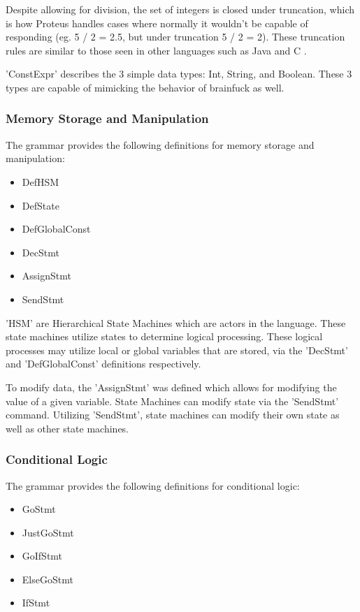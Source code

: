 Despite allowing for division, the set of integers is closed under truncation, which is how Proteus handles cases where normally it wouldn't be capable of responding (eg. 5 / 2 = 2.5, but under truncation 5 / 2 = 2).
These truncation rules are similar to those seen in other languages such as Java and C \cite{TruncJava,TruncC}.

'ConstExpr' describes the 3 simple data types: Int, String, and Boolean.
These 3 types are capable of mimicking the behavior of brainfuck as well.

\subsubsection{Memory Storage and Manipulation}\label{subsubsec:MemStoManip}

The grammar provides the following definitions for memory storage and manipulation:
\begin{itemize}
    \item DefHSM
    \item DefState
    \item DefGlobalConst
    \item DecStmt
    \item AssignStmt
    \item SendStmt
\end{itemize}

'HSM' are Hierarchical State Machines which are actors in the language.
These state machines utilize states to determine logical processing.
These logical processes may utilize local or global variables that are stored, via the 'DecStmt' and 'DefGlobalConst' definitions respectively.

To modify data, the 'AssignStmt' was defined which allows for modifying the value of a given variable.
State Machines can modify state via the 'SendStmt' command.
Utilizing 'SendStmt', state machines can modify their own state as well as other state machines.

\subsubsection{Conditional Logic}\label{subsubsec:CondLog}

The grammar provides the following definitions for conditional logic:
\begin{itemize}
    \item GoStmt
    \item JustGoStmt
    \item GoIfStmt
    \item ElseGoStmt
    \item IfStmt
\end{itemize}

